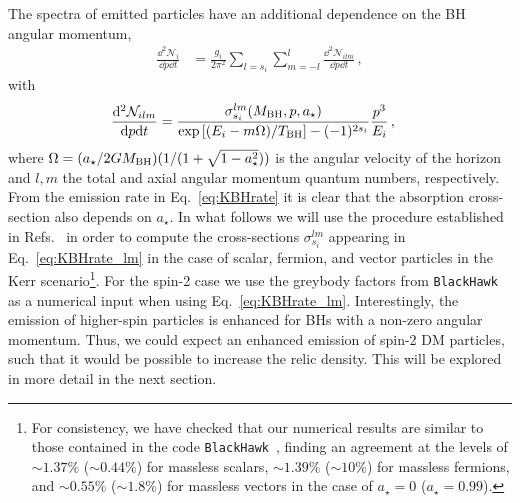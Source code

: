 \documentclass[aps,prd,reprint,twocolumn,preprintnumbers,floatfix,nofootinbib]{revtex4-1}
\newcommand{\TBH}{T_{\rm BH}}
\newcommand{\MBH}{M_{\rm BH}}
\begin{document}
The spectra of emitted particles have an additional dependence on the BH angular momentum,
\begin{align}\label{eq:KBHrate}
\frac{\dd^2 \mathcal{N}_{i}}{\dd p\dd t}&=\frac{g_i}{2\pi^2} \sum_{l=s_i}\sum_{m=-l}^l\frac{\dd^2 \mathcal{N}_{ilm}}{\dd p\dd t}\,,
\end{align}
with
\begin{align}\label{eq:KBHrate_lm}
\frac{\dd^2 \mathcal{N}_{ilm}}{\dd p\dd t}&=\frac{\sigma_{s_i}^{lm}(\MBH,p,a_\star)}{\exp\left[(E_i - m\Omega)/\TBH\right]-( -1)^{2s_i}}\frac{p^3}{E_i}\,,
\end{align}
where $\Omega = (a_\star/2G\MBH)(1/(1+\sqrt{1-a_\star^2}))$ is the angular velocity of the horizon and $l,m$ the total and axial angular momentum quantum numbers, respectively. From the emission rate in Eq.~\eqref{eq:KBHrate} it is clear that the absorption cross-section also depends on $a_\star$. In what follows we will use the procedure established in Refs.~\cite{Chandrasekhar:1975zz,10.2307/79115,Chandrasekhar:1977kf} in order to compute the cross-sections $\sigma_{s_i}^{lm}$ appearing in Eq.~\eqref{eq:KBHrate_lm} in the case of scalar, fermion, and vector particles in the Kerr scenario\footnote{For consistency, we have checked that our numerical results are similar to those contained in the code {\tt BlackHawk}~\cite{Arbey:2019mbc}, finding an agreement at the levels of $\sim 1.37\%$ ($\sim 0.44\%$) for massless scalars, $\sim 1.39\%$ ($\sim 10\%$) for massless fermions, and $\sim 0.55\%$ ($\sim 1.8\%$) for massless vectors in the case of $a_\star=0$ ($a_\star=0.99$).}. For the spin-2 case \cite{Chandrasekhar:1976zz} we use the greybody factors from {\tt BlackHawk} as a numerical input when using Eq.~\eqref{eq:KBHrate_lm}. Interestingly, the emission of higher-spin particles is enhanced for BHs with a non-zero angular momentum. Thus, we could expect an enhanced emission of spin-2 DM particles, such that it would be possible to increase the relic density. This will be explored in more detail in the next section.
\end{document}
